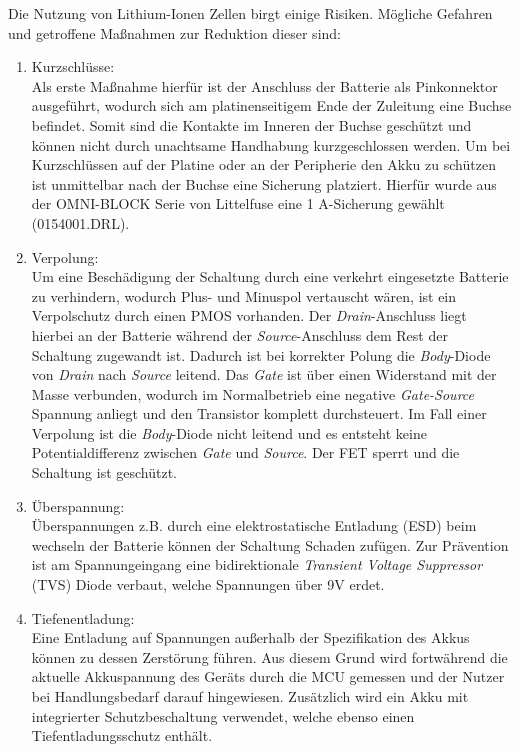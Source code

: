 Die Nutzung von Lithium-Ionen Zellen birgt einige Risiken. Mögliche Gefahren und getroffene Maßnahmen zur Reduktion dieser sind:

\begin{enumerate}
	\item Kurzschlüsse: \\
	Als erste Maßnahme hierfür ist der Anschluss der Batterie als Pinkonnektor ausgeführt, wodurch sich am platinenseitigem Ende der Zuleitung eine Buchse befindet. Somit sind die Kontakte im Inneren der Buchse geschützt und können nicht durch unachtsame Handhabung kurzgeschlossen werden. Um bei Kurzschlüssen auf der Platine oder an der Peripherie den Akku zu schützen ist unmittelbar nach der Buchse eine Sicherung platziert. Hierfür wurde aus der OMNI-BLOCK Serie von Littelfuse eine 1 A-Sicherung gewählt (0154001.DRL). 
	
	\item Verpolung: \\
Um eine Beschädigung der Schaltung durch eine verkehrt eingesetzte Batterie zu verhindern, wodurch Plus- und Minuspol vertauscht wären, ist ein Verpolschutz durch einen PMOS vorhanden. Der \textit{Drain}-Anschluss liegt hierbei an der Batterie während der \textit{Source}-Anschluss dem Rest der Schaltung zugewandt ist. Dadurch ist bei korrekter Polung die \textit{Body}-Diode von \textit{Drain} nach \textit{Source} leitend. Das \textit{Gate} ist über einen Widerstand mit der Masse verbunden, wodurch im Normalbetrieb eine negative \textit{Gate-Source} Spannung anliegt und den Transistor komplett durchsteuert. Im Fall einer Verpolung ist die \textit{Body}-Diode nicht leitend und es entsteht keine Potentialdifferenz zwischen \textit{Gate} und \textit{Source}. Der FET sperrt und die Schaltung ist geschützt.

	\item Überspannung:\\
	Überspannungen z.B. durch eine elektrostatische Entladung (ESD) beim wechseln der Batterie können der Schaltung Schaden zufügen. Zur Prävention ist am Spannungeingang eine bidirektionale \textit{Transient Voltage Suppressor} (TVS) Diode verbaut, welche Spannungen über 9V erdet.
	
	\item Tiefenentladung:\\
	Eine Entladung auf Spannungen außerhalb der Spezifikation des Akkus können zu dessen Zerstörung führen. Aus diesem Grund wird fortwährend die aktuelle Akkuspannung des Geräts durch die MCU gemessen und der Nutzer bei Handlungsbedarf darauf hingewiesen. Zusätzlich wird ein Akku mit integrierter Schutzbeschaltung verwendet, welche ebenso einen Tiefentladungsschutz enthält.

\end{enumerate}

